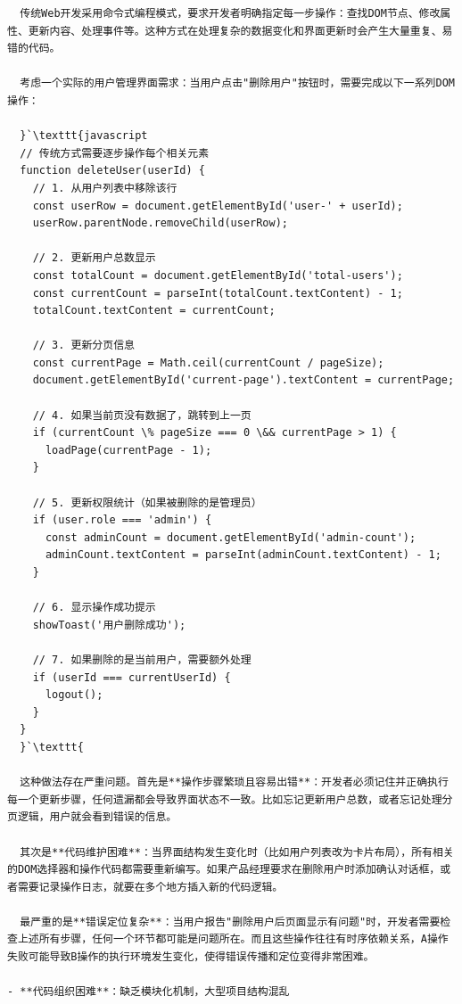 {{\begin{lstlisting}
  传统Web开发采用命令式编程模式，要求开发者明确指定每一步操作：查找DOM节点、修改属性、更新内容、处理事件等。这种方式在处理复杂的数据变化和界面更新时会产生大量重复、易错的代码。

  考虑一个实际的用户管理界面需求：当用户点击"删除用户"按钮时，需要完成以下一系列DOM操作：

  }`\texttt{javascript
  // 传统方式需要逐步操作每个相关元素
  function deleteUser(userId) {
    // 1. 从用户列表中移除该行
    const userRow = document.getElementById('user-' + userId);
    userRow.parentNode.removeChild(userRow);
    
    // 2. 更新用户总数显示
    const totalCount = document.getElementById('total-users');
    const currentCount = parseInt(totalCount.textContent) - 1;
    totalCount.textContent = currentCount;
    
    // 3. 更新分页信息
    const currentPage = Math.ceil(currentCount / pageSize);
    document.getElementById('current-page').textContent = currentPage;
    
    // 4. 如果当前页没有数据了，跳转到上一页
    if (currentCount \% pageSize === 0 \&& currentPage > 1) {
      loadPage(currentPage - 1);
    }
    
    // 5. 更新权限统计（如果被删除的是管理员）
    if (user.role === 'admin') {
      const adminCount = document.getElementById('admin-count');
      adminCount.textContent = parseInt(adminCount.textContent) - 1;
    }
    
    // 6. 显示操作成功提示
    showToast('用户删除成功');
    
    // 7. 如果删除的是当前用户，需要额外处理
    if (userId === currentUserId) {
      logout();
    }
  }
  }`\texttt{

  这种做法存在严重问题。首先是**操作步骤繁琐且容易出错**：开发者必须记住并正确执行每一个更新步骤，任何遗漏都会导致界面状态不一致。比如忘记更新用户总数，或者忘记处理分页逻辑，用户就会看到错误的信息。

  其次是**代码维护困难**：当界面结构发生变化时（比如用户列表改为卡片布局），所有相关的DOM选择器和操作代码都需要重新编写。如果产品经理要求在删除用户时添加确认对话框，或者需要记录操作日志，就要在多个地方插入新的代码逻辑。

  最严重的是**错误定位复杂**：当用户报告"删除用户后页面显示有问题"时，开发者需要检查上述所有步骤，任何一个环节都可能是问题所在。而且这些操作往往有时序依赖关系，A操作失败可能导致B操作的执行环境发生变化，使得错误传播和定位变得非常困难。

- **代码组织困难**：缺乏模块化机制，大型项目结构混乱


\end{lstlisting}}}
